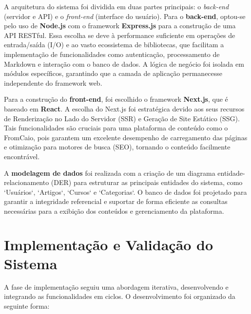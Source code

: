 A arquitetura do sistema foi dividida em duas partes principais: o \textit{back-end} (servidor e API) e o \textit{front-end} (interface do usuário). Para o \textbf{back-end}, optou-se pelo uso de \textbf{Node.js} com o framework \textbf{Express.js} para a construção de uma API RESTful. Essa escolha se deve à performance suficiente em operações de entrada/saída (I/O) e ao vasto ecossistema de bibliotecas, que facilitam a implementação de funcionalidades como autenticação, processamento de Markdown e interação com o banco de dados. A lógica de negócio foi isolada em módulos específicos, garantindo que a camada de aplicação permanecesse independente do framework web.

Para a construção do \textbf{front-end}, foi escolhido o framework \textbf{Next.js}, que é baseado em \textbf{React}. A escolha do Next.js foi estratégica devido aos seus recursos de Renderização no Lado do Servidor (SSR) e Geração de Site Estático (SSG). Tais funcionalidades são cruciais para uma plataforma de conteúdo como o FromCaio, pois garantem um excelente desempenho de carregamento das páginas e otimização para motores de busca (SEO), tornando o conteúdo facilmente encontrável.

A \textbf{modelagem de dados} foi realizada com a criação de um diagrama entidade-relacionamento (DER) para estruturar as principais entidades do sistema, como `Usuários`, `Artigos`, `Cursos` e `Categorias`. O banco de dados foi projetado para garantir a integridade referencial e suportar de forma eficiente as consultas necessárias para a exibição dos conteúdos e gerenciamento da plataforma.

\section{Implementação e Validação do Sistema}

A fase de implementação seguiu uma abordagem iterativa, desenvolvendo e integrando as funcionalidades em ciclos. O desenvolvimento foi organizado da seguinte forma:

